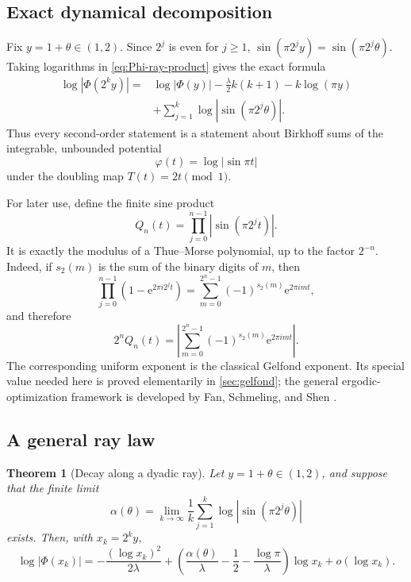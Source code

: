 \documentclass[11pt,oneside]{article}
\newtheorem{theorem}{Theorem}[section]
\theoremstyle{definition}
\theoremstyle{remark}
\newcommand{\e}{\mathrm e}
\newcommand{\smallo}{o}
\newcommand{\PhiF}{\Phi}
\begin{document}
\subsection{Exact dynamical decomposition}

Fix \(y=1+\theta\in(1,2)\).  Since \(2^j\) is even for \(j\ge1\),
\(
 \sin(\pi2^j y)=\sin(\pi2^j\theta).
\)
Taking logarithms in \eqref{eq:Phi-ray-product} gives the exact formula
\begin{equation}
\begin{split}
 \log|\PhiF(2^k y)|
 ={}&\log|\PhiF(y)|
 -\frac{\lambda}{2}k(k+1)
 -k\log(\pi y)\\
 &+\sum_{j=1}^{k}\log|\sin(\pi2^j\theta)|.
\end{split}
\label{eq:ray-log-exact}
\end{equation}
Thus every second-order statement is a statement about Birkhoff sums of the
integrable, unbounded potential
\begin{equation}
 \varphi(t)=\log|\sin\pi t|
 \label{eq:potential}
\end{equation}
under the doubling map \(T(t)=2t\pmod1\).

For later use, define the finite sine product
\begin{equation}
 Q_n(t)=\prod_{j=0}^{n-1}|\sin(\pi2^j t)|.
 \label{eq:Qn-definition}
\end{equation}
It is exactly the modulus of a Thue--Morse polynomial, up to the factor
\(2^{-n}\).  Indeed, if \(s_2(m)\) is the sum of the binary digits of \(m\),
then
\begin{equation}
 \prod_{j=0}^{n-1}(1-\e^{2\pi i2^j t})
 =\sum_{m=0}^{2^n-1}(-1)^{s_2(m)}\e^{2\pi i m t},
 \label{eq:TM-polynomial}
\end{equation}
and therefore
\begin{equation}
 2^nQ_n(t)=
 \left|\sum_{m=0}^{2^n-1}(-1)^{s_2(m)}\e^{2\pi i m t}\right|.
 \label{eq:Q-TM-modulus}
\end{equation}
The corresponding uniform exponent is the classical Gelfond exponent.  Its
special value needed here is proved elementarily in \cref{sec:gelfond}; the
general ergodic-optimization framework is developed by Fan, Schmeling, and
Shen \cite{fan2021}.

\subsection{A general ray law}

\begin{theorem}[Decay along a dyadic ray]
\label{thm:general-ray}
Let \(y=1+\theta\in(1,2)\), and suppose that the finite limit
\begin{equation}
 \alpha(\theta)=
 \lim_{k\to\infty}\frac1k
 \sum_{j=1}^{k}\log|\sin(\pi2^j\theta)|
 \label{eq:alpha-definition}
\end{equation}
exists.  Then, with \(x_k=2^k y\),
\begin{equation}
 \log|\PhiF(x_k)|
 =-\frac{(\log x_k)^2}{2\lambda}
 +\left(
   \frac{\alpha(\theta)}{\lambda}
   -\frac12-\frac{\log\pi}{\lambda}
  \right)\log x_k
 +\smallo(\log x_k).
 \label{eq:general-ray-asymptotic}
\end{equation}
\end{theorem}
\end{document}
